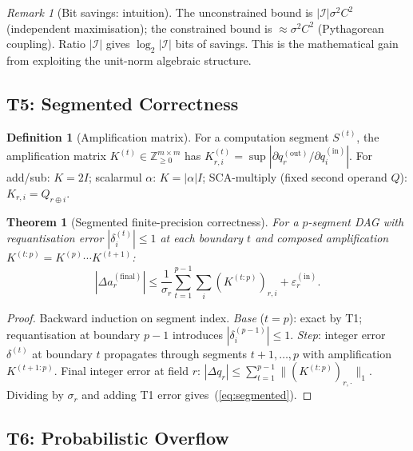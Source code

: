 \documentclass[11pt,a4paper]{article}
\theoremstyle{definition}
\newtheorem{definition}{Definition}[section]
\theoremstyle{plain}
\newtheorem{theorem}{Theorem}[section]
\theoremstyle{remark}
\newtheorem{remark}{Remark}[section]
\begin{document}
\begin{remark}[Bit savings: intuition]
The unconstrained bound is $|\mathcal{I}|\sigma^2C^2$ (independent
maximisation); the constrained bound is $\approx\sigma^2C^2$
(Pythagorean coupling).
Ratio $|\mathcal{I}|$ gives $\log_2|\mathcal{I}|$ bits of savings.
This is the mathematical gain from exploiting the unit-norm algebraic structure.
\end{remark}

\subsection{T5: Segmented Correctness}
\label{sec:segmented}

\begin{definition}[Amplification matrix]
For a computation segment $S^{(t)}$, the amplification matrix
$K^{(t)}\in\mathbb{Z}_{\ge0}^{m\times m}$ has
$K^{(t)}_{r,i}=\sup|\partial q_r^{(\mathrm{out})}/\partial q_i^{(\mathrm{in})}|$.
For add/sub: $K=2I$; scalarmul $\alpha$: $K=|\alpha|I$;
SCA-multiply (fixed second operand $Q$): $K_{r,i}=Q_{r\oplus i}$.
\end{definition}

\begin{theorem}[Segmented finite-precision correctness]
\label{thm:segmented}
For a $p$-segment DAG with requantisation error $|\delta_i^{(t)}|\le1$
at each boundary $t$ and composed amplification
$K^{(t:p)}=K^{(p)}\cdots K^{(t+1)}$:
\begin{equation}\label{eq:segmented}
  |\Delta a_r^{(\mathrm{final})}|
  \le \frac{1}{\sigma_r}\sum_{t=1}^{p-1}\sum_i(K^{(t:p)})_{r,i}
  + \varepsilon_r^{(\mathrm{in})}.
\end{equation}
\end{theorem}

\begin{proof}
Backward induction on segment index.
\emph{Base} ($t=p$): exact by T1; requantisation at boundary $p-1$ introduces
$|\delta_i^{(p-1)}|\le1$.
\emph{Step}: integer error $\delta^{(t)}$ at boundary $t$ propagates through
segments $t+1,\ldots,p$ with amplification $K^{(t+1:p)}$.
Final integer error at field $r$:
$|\Delta q_r|\le\sum_{t=1}^{p-1}\|(K^{(t:p)})_{r,\cdot}\|_1$.
Dividing by $\sigma_r$ and adding T1 error gives~(\ref{eq:segmented}).
\end{proof}

\subsection{T6: Probabilistic Overflow}
\label{sec:prob}
\end{document}

